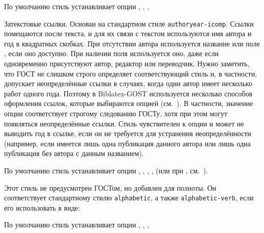 \documentclass[10pt,a4paper,headings=small,numbers=enddot,english,russian]{ltxdockit}
\newcommand*{\biblatexgost}{Biblatex-GOST\xspace}
\newcommand*{\bibsty}{\texttt}
\begin{document}
\begin{marglist}
По умолчанию стиль устанавливает опции , .
.

\item[gost-authoryear]
Затекстовые ссылки. Основан на стандартном
стиле \bibsty{authoryear-icomp}. Ссылки помещаются после текста, и для их связи
с текстом используются имя автора и год в квадратных скобках. 
При отсутствии автора
используется название или поле , если оно доступно.
При наличии поля  используется оно, даже если одновременно присутствуют
автор, редактор или переводчик. Нужно заметить, что ГОСТ
не слишком строго определяет соответствующий стиль и, в частности, допускает неопределённые
ссылки в случаях, когда один автор имеет несколько
работ одного года. Поэтому в \biblatexgost используется несколько способов оформления
ссылок, которые выбираются опцией  (см.~).
В частности, значение опции  соответствует строгому
следованию ГОСТу, хотя при этом могут появляться неопределённые ссылки.
Стиль чувствителен к опции  и может не выводить год в ссылке, если он
не требуется для устранения неопределённости (например, если имеется лишь одна публикация
данного автора или лишь одна публикация без автора с данным названием).

По умолчанию стиль устанавливает опции
,
,
,
,
 (или  при ,
см.~).

\item[gost-alphabetic]
Этот стиль не предусмотрен ГОСТом, но добавлен для полноты. Он соответствует стандартному
стилю \bibsty{alphabetic}, а также \bibsty{alphabetic-verb}, если его использовать в виде:

\begin{ltxcode}
\usepackage[%
    citestyle=alphabetic-verb,
    bibstyle=gost-alphabetic,
    ...
]{biblatex}
\end{ltxcode}

По умолчанию стиль устанавливает опции
,
,
,


\end{marglist}
\end{document}

